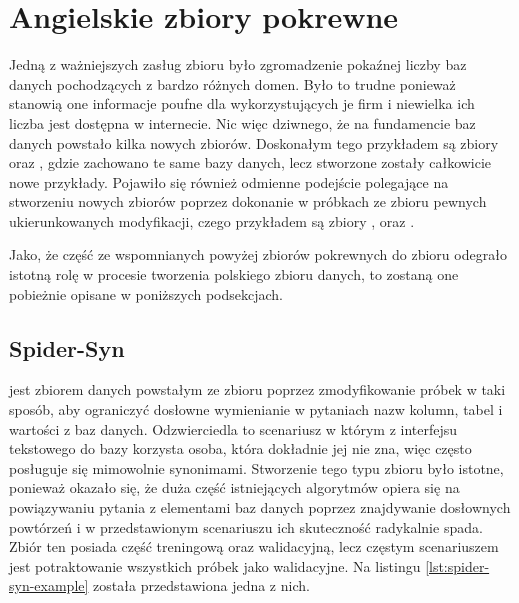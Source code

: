 \section{Angielskie zbiory pokrewne} \label{text:related-datasets}
Jedną z ważniejszych zasług zbioru  było zgromadzenie pokaźnej liczby baz danych pochodzących z bardzo różnych domen. Było to trudne ponieważ stanowią one informacje poufne dla wykorzystujących je firm i niewielka ich liczba jest dostępna w internecie. Nic więc dziwnego, że na fundamencie baz danych  powstało kilka nowych zbiorów. Doskonałym tego przykładem są zbiory  oraz , gdzie zachowano te same bazy danych, lecz stworzone zostały całkowicie nowe przykłady. Pojawiło się również odmienne podejście polegające na stworzeniu nowych zbiorów poprzez dokonanie w próbkach ze zbioru  pewnych ukierunkowanych modyfikacji, czego przykładem są zbiory ,  oraz .

Jako, że część ze wspomnianych powyżej zbiorów pokrewnych do zbioru  odegrało istotną rolę w procesie tworzenia polskiego zbioru danych, to zostaną one pobieżnie opisane w poniższych podsekcjach.

\subsection{Spider-Syn}
 jest zbiorem danych powstałym ze zbioru  poprzez zmodyfikowanie próbek w taki sposób, aby ograniczyć dosłowne wymienianie w pytaniach nazw kolumn, tabel i wartości z baz danych. Odzwierciedla to scenariusz w którym z interfejsu tekstowego do bazy korzysta osoba, która dokładnie jej nie zna, więc często posługuje się mimowolnie synonimami. Stworzenie tego typu zbioru było istotne, ponieważ okazało się, że duża część istniejących algorytmów opiera się na powiązywaniu pytania z elementami baz danych poprzez znajdywanie dosłownych powtórzeń i w przedstawionym scenariuszu ich skuteczność radykalnie spada. Zbiór ten posiada część treningową oraz walidacyjną, lecz częstym scenariuszem jest potraktowanie wszystkich próbek jako walidacyjne. Na listingu \ref{lst:spider-syn-example} została przedstawiona jedna z nich.

\begin{minipage}{\linewidth}

\end{minipage}

